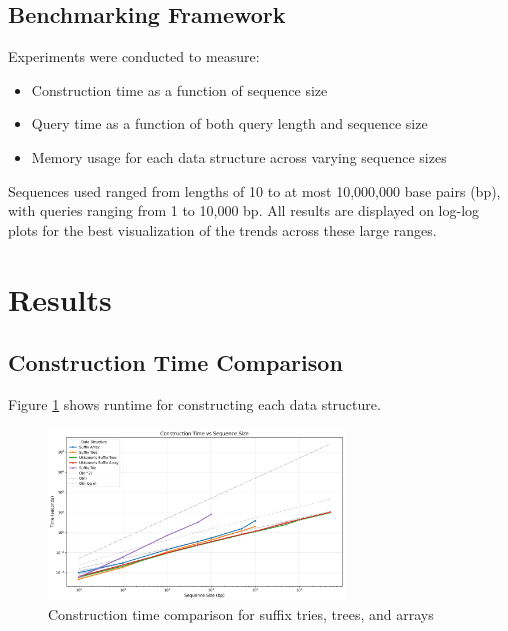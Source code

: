 \documentclass[11pt, letterpaper]{article}
\begin{document}
\subsection{Benchmarking Framework}
Experiments were conducted to measure:
\begin{itemize}
    \item Construction time as a function of sequence size
    \item Query time as a function of both query length and sequence size
    \item Memory usage for each data structure across varying sequence sizes
\end{itemize}
Sequences used ranged from lengths of 10 to at most 10,000,000 base pairs (bp), with queries ranging from 1 to 10,000 bp. All results are displayed on log-log plots for the best visualization of the trends across these large ranges.

\section{Results}
\subsection{Construction Time Comparison}
Figure \ref{fig:construction_time} shows runtime for constructing each data structure.
\begin{figure}[H]
  \centering
  \includegraphics[width=0.7\textwidth]{../figures/construction_time.png}
  \caption{Construction time comparison for suffix tries, trees, and arrays}
  \label{fig:construction_time}
\end{figure}
\end{document}
